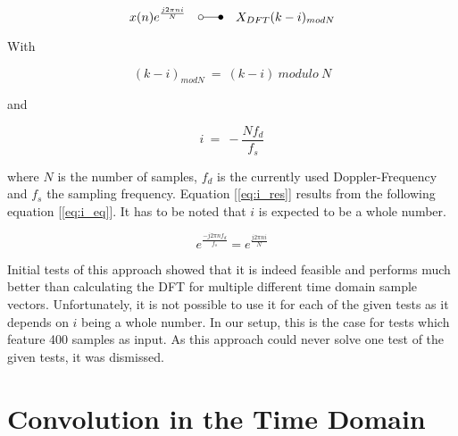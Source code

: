			\begin{equation} 
				\label{eq:freq_dom_shift}
				x(n)e^{\frac{j2{\pi}ni}{N}}\quad \laplace\quad X_{DFT}(k-i)_{mod N} %
			\end{equation}

			With 

			\begin{equation} 
				(k-i)_{mod N}\ =\ (k-i)\ modulo\ N
			\end{equation}

			and 

			\begin{equation}
				\label{eq:i_res}
				i\ =\ -\frac{Nf_d}{f_s}
			\end{equation}

			where $N$ is the number of samples, $f_d$ is the currently used Doppler-Frequency and $f_s$ the sampling frequency. Equation [\ref{eq:i_res}] results from the following equation [\ref{eq:i_eq}]. It has to be noted that $i$ is expected to be a whole number.

			\begin{equation} 
				\label{eq:i_eq}
				e^{\frac{-j2{\pi}nf_d}{f_s}} = e^{\frac{j2{\pi}ni}{N}}
			\end{equation}

			Initial tests of this approach showed that it is indeed feasible and performs much better than calculating the DFT for multiple different time domain sample vectors. Unfortunately, it is not possible to use it for each of the given tests as it depends on $i$ being a whole number. In our setup, this is the case for tests which feature \num{400} samples as input. As this approach could never solve one test of the given tests, it was dismissed.
		
		\section{Convolution in the Time Domain} %
		\label{sec:convolution_in_the_time_domain}\newline
	  		
